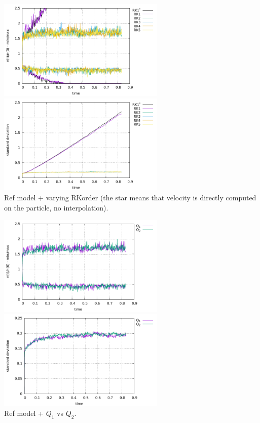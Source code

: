 \begin{center}
\includegraphics[width=8cm]{python_codes/fieldstone_30/results_streamline/markercount_rk12345}
\includegraphics[width=8cm]{python_codes/fieldstone_30/results_streamline/stdev_rk12345}\\
{\captionfont Ref model + varying RKorder (the star means that velocity 
is directly computed on the particle, no interpolation).}
\end{center} 

\begin{center}
\includegraphics[width=8cm]{python_codes/fieldstone_30/results_streamline/markercount_q12}
\includegraphics[width=8cm]{python_codes/fieldstone_30/results_streamline/stdev_q12}\\
{\captionfont Ref model + $Q_1$ vs $Q_2$. }
\end{center}

